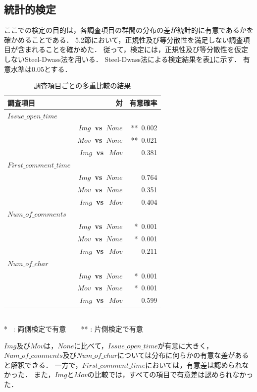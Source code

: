 \subsection{統計的検定}
ここでの検定の目的は，各調査項目の群間の分布の差が統計的に有意であるかを確かめることである．
5.2節において，正規性及び等分散性を満足しない調査項目が含まれることを確かめた．
従って，検定には，正規性及び等分散性を仮定しないSteel-Dwass法を用いる．
Steel-Dwass法による検定結果を表\ref{Steel-Dwass_result}に示す．
有意水準は0.05とする．

\begin{table}[t]
  \begin{center}
  \caption{調査項目ごとの多重比較の結果}
  \begin{tabular}{l r|r}
    \hline
    調査項目 & 対 & 有意確率 \\
    \hline \hline
    $Issue\_open\_time$ & & \\
     & \bf{$Img$~vs~$None$} & **~0.002 \\
     & \bf{$Mov$~vs~$None$} & **~0.021 \\
     & \bf{$Img$~vs~$~Mov$} & 0.381 \\
    \hline
    $First\_comment\_time$ & & \\
     & \bf{$Img$~vs~$None$} & 0.764 \\
     & \bf{$Mov$~vs~$None$} & 0.351 \\
     & \bf{$Img$~vs~$~Mov$} & 0.404 \\
    \hline
    $Num\_of\_comments$ & & \\
     & \bf{$Img$~vs~$None$} & *~0.001 \\
     & \bf{$Mov$~vs~$None$} & *~0.001 \\
     & \bf{$Img$~vs~$~Mov$} & 0.211 \\
    \hline
    $Num\_of\_char$ & & \\
     & \bf{$Img$~vs~$None$} & *~0.001 \\
     & \bf{$Mov$~vs~$None$} & *~0.001 \\
     & \bf{$Img$~vs~$~Mov$} & 0.599 \\
    \hline
  \end{tabular}\\
  \small
    *~ : 両側検定で有意 ~~~ ** : 片側検定で有意\\
  \label{Steel-Dwass_result}
  \end{center}
\end{table}

$Img$及び$Mov$は，$None$に比べて，$Issue\_open\_time$が有意に大きく，
$Num\_of\_comments$及び$Num\_of\_char$については分布に何らかの有意な差があると解釈できる．
一方で，$First\_comment\_time$においては，有意差は認められなかった．
また，$Img$と$Mov$の比較では，すべての項目で有意差は認められなかった．

